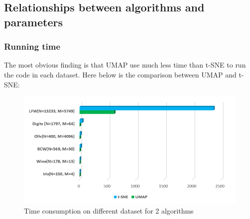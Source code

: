 \subsection{Relationships between algorithms and parameters}

\subsubsection{Running time}

The most obvious finding is that UMAP use much less time than t-SNE to run the code in each dataset. Here below is the comparison between UMAP and t-SNE: 

\begin{figure}[ht]

\centering
\includegraphics[width=12cm,height=7cm\textwidth]{images/image_time_umap_t-SNE.PNG}
\caption{Time consumption on different dataset for 2 algorithms
}
\label{fig:label}
\end{figure}\\

